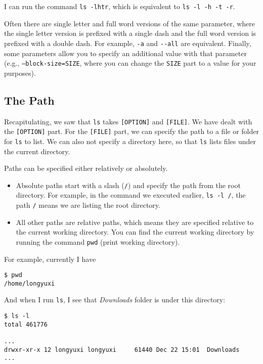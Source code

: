 \documentclass[12pt,letterpaper]{article}
\begin{document}
I can run the command \texttt{ls -lhtr}, which is equivalent to \texttt{ls -l -h -t -r}.

Often there are single letter and full word versions of the same parameter, where the single letter version is prefixed with a single dash and the full word version is prefixed with a double dash. For example, \texttt{-a} and \texttt{-{}-all} are equivalent. Finally, some parameters allow you to specify an additional value with that parameter (e.g., \texttt{--block-size=SIZE}, where you can change the \texttt{SIZE} part to a value for your purposes).

\subsection{The Path} \label{sec:path}

Recapitulating, we saw that \texttt{ls} takes \texttt{[OPTION]} and \texttt{[FILE]}. We have dealt with the \texttt{[OPTION]} part. For the \texttt{[FILE]} part, we can specify the path to a file or folder for \texttt{ls} to list. We can also not specify a directory here, so that \texttt{ls} lists files under the current directory.

Paths can be specified either relatively or absolutely.

\begin{itemize}
   \item Absolute paths start with a slash (\texttt{/}) and specify the path from the root directory. For example, in the command we executed earlier, \texttt{ls -l /}, the path \texttt{/} means we are listing the root directory.
   \item All other paths are relative paths, which means they are specified relative to the current working directory. You can find the current working directory by running the command \texttt{pwd} (print working directory).
\end{itemize}

For example, currently I have

\begin{verbatim}
$ pwd
/home/longyuxi
\end{verbatim}

And when I run \texttt{ls}, I see that \textit{Downloads} folder is under this directory:

\begin{verbatim}
$ ls -l
total 461776

...
drwxr-xr-x 12 longyuxi longyuxi     61440 Dec 22 15:01  Downloads
...
\end{verbatim}
\end{document}
